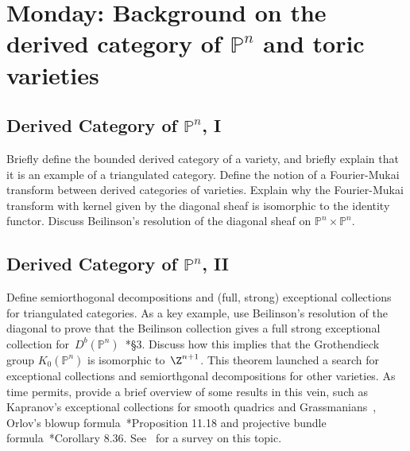 \documentclass[11pt]{amsart}
\numberwithin{equation}{section}
\theoremstyle{definition}
\theoremstyle{remark}
\newcommand{\PP}{\mathbb P}
\begin{document}
\section{Monday: Background on the derived category of $\PP^n$ and toric varieties}

\subsection{Derived Category of $\PP^n$, I}
Briefly define the bounded derived category of a variety, and briefly explain that it is an example of a triangulated category. Define the notion of a Fourier-Mukai transform between derived categories of varieties. Explain why the Fourier-Mukai transform with kernel given by the diagonal sheaf is isomorphic to the identity functor. Discuss Beilinson's resolution of the diagonal sheaf on $\PP^n \times \PP^n$.

 

\subsection{Derived Category of $\PP^n$, II}
Define semiorthogonal decompositions and (full, strong) exceptional collections for triangulated categories. As a key example, use Beilinson's resolution of the diagonal to prove that the Beilinson collection gives a full strong exceptional collection for~$D^b(\PP^n)$~\cite{Caldararu05}*{\S 3}. Discuss how this implies that the Grothendieck group $K_0(\PP^n)$ is isomorphic to~$\Z^{n+1}$. %
This theorem launched a search for exceptional collections and semiorthgonal decompositions for other varieties.  As time permits, provide a brief overview of some results in this vein, such as Kapranov's exceptional collections for smooth quadrics and Grassmanians~\cite{Kapranov88}, 
Orlov's blowup formula~\cite{Huybrechts2006}*{Proposition 11.18} and projective bundle formula~\cite{Huybrechts2006}*{Corollary 8.36}. See~\cite{Kuznetsov14} for a survey on this topic.
\end{document}
